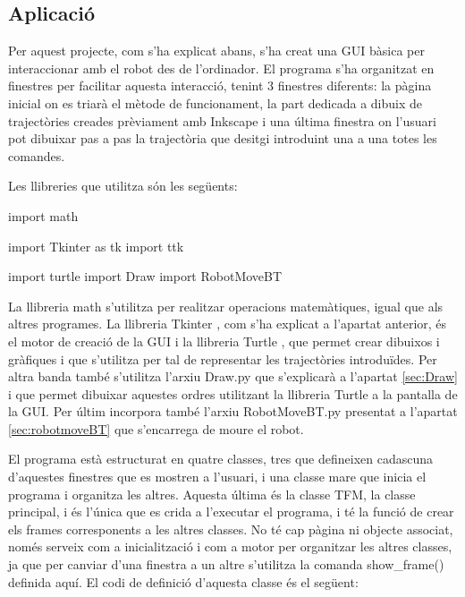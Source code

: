 \subsection{Aplicació}
Per aquest projecte, com s’ha explicat abans, s’ha creat una GUI bàsica per interaccionar amb el robot des de l’ordinador. El programa s’ha organitzat en finestres per facilitar aquesta interacció, tenint 3 finestres diferents: la pàgina inicial on es triarà el mètode de funcionament, la part dedicada a dibuix de trajectòries creades prèviament amb Inkscape i una última finestra on l’usuari pot dibuixar pas a pas la trajectòria que desitgi introduint una a una totes les comandes.

Les llibreries que utilitza són les següents:

\begin{python}
	import math
	
	import Tkinter as tk
	import ttk
	
	import turtle
	import Draw
	import RobotMoveBT
\end{python}

La llibreria math s'utilitza per realitzar operacions matemàtiques, igual que als altres programes. La llibreria Tkinter \cite{TkinterBib}, com s’ha explicat a l’apartat anterior, és el motor de creació de la GUI i la llibreria Turtle \cite{turtleBib}, que permet crear dibuixos i gràfiques i que s’utilitza per tal de representar les trajectòries introduïdes. Per altra banda també s’utilitza l’arxiu Draw.py que s’explicarà a l’apartat \ref{sec:Draw} i que permet dibuixar aquestes ordres utilitzant la llibreria Turtle a la pantalla de la GUI.  Per últim incorpora també l’arxiu RobotMoveBT.py presentat a l’apartat \ref{sec:robotmoveBT} que s’encarrega de moure el robot. 

El programa està estructurat en quatre classes, tres que defineixen cadascuna d’aquestes finestres que es mostren a l’usuari, i una classe mare que inicia el programa i organitza les altres. Aquesta última és la classe TFM, la classe principal, i és l’única que es crida a l'executar el programa, i té la funció de crear els frames corresponents a les altres classes. No té cap pàgina ni objecte associat, només serveix com a inicialització i com a motor per organitzar les altres classes, ja que per canviar d’una finestra a un altre s’utilitza la comanda show\_frame() definida aquí. El codi de definició d’aquesta classe és el següent:

